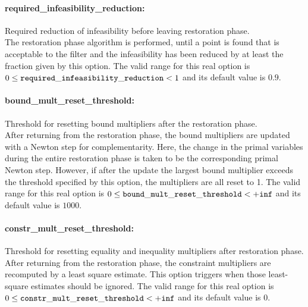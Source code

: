 \paragraph{required\_infeasibility\_reduction:}\label{opt:required_infeasibility_reduction} Required reduction of infeasibility before leaving restoration phase. \\
 The restoration phase algorithm is performed, until a point is found that is acceptable to the filter and the infeasibility has been reduced by at least the fraction given by this option. The valid range for this real option is 
$0 \le {\tt required\_infeasibility\_reduction } <  1$
and its default value is $0.9$.


\paragraph{bound\_mult\_reset\_threshold:}\label{opt:bound_mult_reset_threshold} Threshold for resetting bound multipliers after the restoration phase. \\
 After returning from the restoration phase, the bound multipliers are updated with a Newton step for complementarity.  Here, the change in the primal variables during the entire restoration phase is taken to be the corresponding primal Newton step. However, if after the update the largest bound multiplier exceeds the threshold specified by this option, the multipliers are all reset to 1. The valid range for this real option is 
$0 \le {\tt bound\_mult\_reset\_threshold } <  {\tt +inf}$
and its default value is $1000$.


\paragraph{constr\_mult\_reset\_threshold:}\label{opt:constr_mult_reset_threshold} Threshold for resetting equality and inequality multipliers after restoration phase. \\
 After returning from the restoration phase, the constraint multipliers are recomputed by a least square estimate.  This option triggers when those least-square estimates should be ignored. The valid range for this real option is 
$0 \le {\tt constr\_mult\_reset\_threshold } <  {\tt +inf}$
and its default value is $0$.


